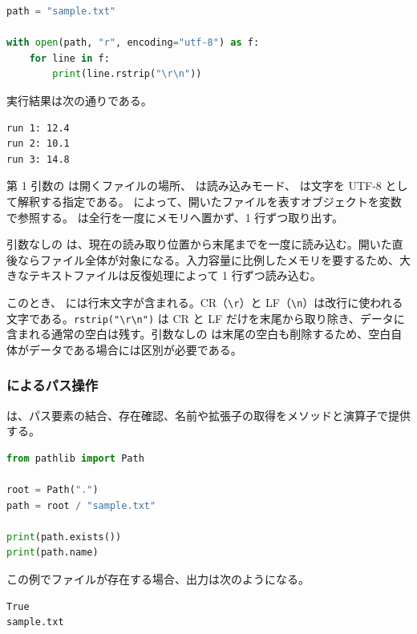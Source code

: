 \begin{lstlisting}[language=Python]
path = "sample.txt"

with open(path, "r", encoding="utf-8") as f:
    for line in f:
        print(line.rstrip("\r\n"))
\end{lstlisting}

実行結果は次の通りである。

\begin{lstlisting}[numbers=none, xleftmargin=2\zw]
run 1: 12.4
run 2: 10.1
run 3: 14.8
\end{lstlisting}

第 1 引数の  は開くファイルの場所、 は読み込みモード、 は文字を UTF-8 として解釈する指定である。 によって、開いたファイルを表すオブジェクトを変数  で参照する。 は全行を一度にメモリへ置かず、1 行ずつ取り出す。

引数なしの  は、現在の読み取り位置から末尾までを一度に読み込む。開いた直後ならファイル全体が対象になる。入力容量に比例したメモリを要するため、大きなテキストファイルは反復処理によって 1 行ずつ読み込む。

このとき、 には行末文字が含まれる。CR（\verb|\r|）と LF（\verb|\n|）は改行に使われる文字である。\verb|rstrip("\r\n")| は CR と LF だけを末尾から取り除き、データに含まれる通常の空白は残す。引数なしの  は末尾の空白も削除するため、空白自体がデータである場合には区別が必要である。

\subsubsection{ によるパス操作}

 は、パス要素の結合、存在確認、名前や拡張子の取得をメソッドと演算子で提供する。

\begin{lstlisting}[language=Python]
from pathlib import Path

root = Path(".")
path = root / "sample.txt"

print(path.exists())
print(path.name)
\end{lstlisting}

この例でファイルが存在する場合、出力は次のようになる。

\begin{lstlisting}[numbers=none, xleftmargin=2\zw]
True
sample.txt
\end{lstlisting}

